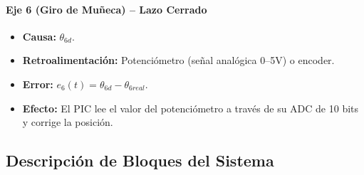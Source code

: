 \documentclass[11pt]{article}
\begin{document}
\paragraph{Eje 6 (Giro de Muñeca) – Lazo Cerrado}
\begin{itemize}
	\item \textbf{Causa:} $\theta_{6d}$.
	\item \textbf{Retroalimentación:} Potenciómetro (señal analógica 0–5V) o encoder.
	\item \textbf{Error:} $e_6(t) = \theta_{6d} - \theta_{6real}$.
	\item \textbf{Efecto:} El PIC lee el valor del potenciómetro a través de su ADC de 10 bits y corrige la posición.
\end{itemize}

\subsection{Descripción de Bloques del Sistema}
\end{document}
